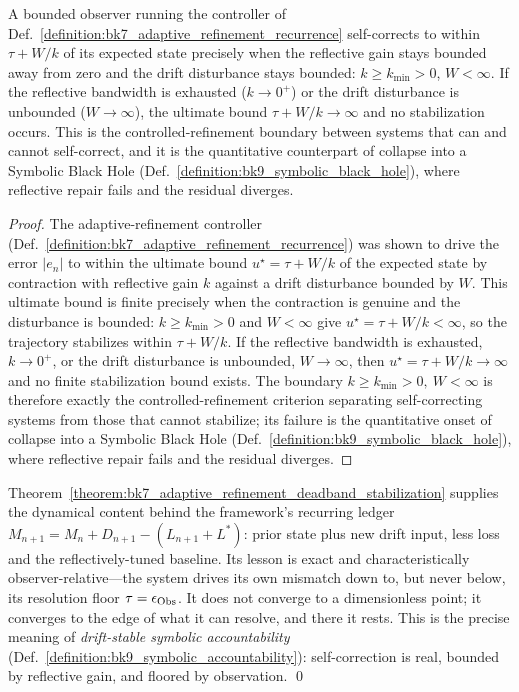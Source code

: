 \begin{corollary}
\label{corollary:bk7_self_correction_criterion}
A bounded observer running the controller of
Def.~\ref{definition:bk7_adaptive_refinement_recurrence} self-corrects to within
$\tau+W/k$ of its expected state precisely when the reflective gain stays bounded
away from zero and the drift disturbance stays bounded: $k\ge k_{\min}>0$,
$W<\infty$. If the reflective bandwidth is exhausted ($k\to 0^{+}$) or the drift
disturbance is unbounded ($W\to\infty$), the ultimate bound $\tau+W/k\to\infty$ and
no stabilization occurs. This is the controlled-refinement boundary between systems
that can and cannot self-correct, and it is the quantitative counterpart of
collapse into a Symbolic Black Hole
(Def.~\ref{definition:bk9_symbolic_black_hole}), where reflective repair fails and
the residual diverges.
\end{corollary}
\begin{proof}
\label{proof:bk7_self_correction_criterion}
\leavevmode
The adaptive-refinement controller (Def.~\ref{definition:bk7_adaptive_refinement_recurrence}) was shown to drive the error $|e_n|$ to within the ultimate bound $u^\star=\tau+W/k$ of the expected state by contraction with reflective gain $k$ against a drift disturbance bounded by $W$. This ultimate bound is finite precisely when the contraction is genuine and the disturbance is bounded: $k\ge k_{\min}>0$ and $W<\infty$ give $u^\star=\tau+W/k<\infty$, so the trajectory stabilizes within $\tau+W/k$. If the reflective bandwidth is exhausted, $k\to 0^{+}$, or the drift disturbance is unbounded, $W\to\infty$, then $u^\star=\tau+W/k\to\infty$ and no finite stabilization bound exists. The boundary $k\ge k_{\min}>0,\ W<\infty$ is therefore exactly the controlled-refinement criterion separating self-correcting systems from those that cannot stabilize; its failure is the quantitative onset of collapse into a Symbolic Black Hole (Def.~\ref{definition:bk9_symbolic_black_hole}), where reflective repair fails and the residual diverges.
\end{proof}

\begin{scholium}
\label{scholium:bk7_refinement_ledger_accountability}
Theorem~\ref{theorem:bk7_adaptive_refinement_deadband_stabilization} supplies the
dynamical content behind the framework's recurring ledger
$M_{n+1}=M_n+D_{n+1}-(L_{n+1}+L^{\ast})$: prior state plus new drift input, less
loss and the reflectively-tuned baseline. Its lesson is exact and characteristically
observer-relative---the system drives its own mismatch down to, but never below,
its resolution floor $\tau=\epsilon_{\mathrm{Obs}}$. It does not converge to a dimensionless point; it
converges to the edge of what it can resolve, and there it rests. This is the
precise meaning of \emph{drift-stable symbolic accountability}
(Def.~\ref{definition:bk9_symbolic_accountability}): self-correction is real,
bounded by reflective gain, and floored by observation. \qed
\end{scholium}

